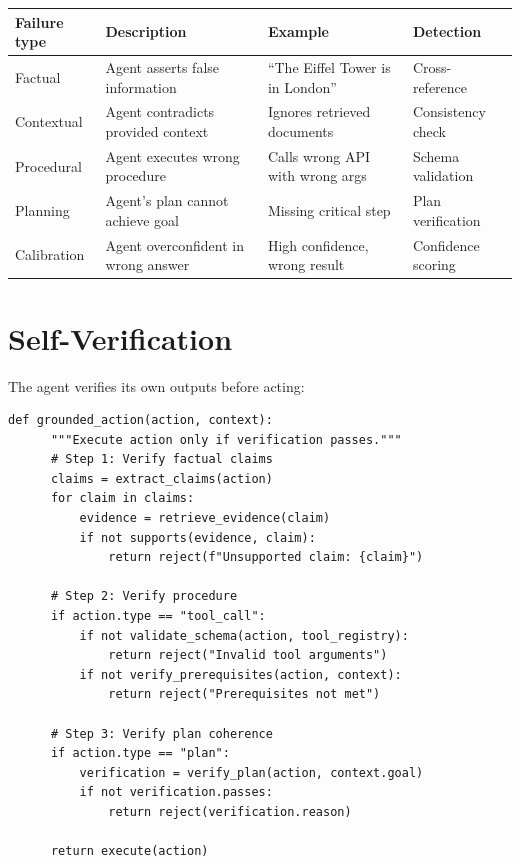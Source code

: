 \begin{longtable}{p{3.5cm}p{4.5cm}p{4.5cm}p{2.5cm}}
	\toprule
	\textbf{Failure type} & \textbf{Description}                & \textbf{Example}                  & \textbf{Detection} \\
	\midrule
	Factual               & Agent asserts false information     & ``The Eiffel Tower is in London'' & Cross-reference    \\
	Contextual            & Agent contradicts provided context  & Ignores retrieved documents       & Consistency check  \\
	Procedural            & Agent executes wrong procedure      & Calls wrong API with wrong args   & Schema validation  \\
	Planning              & Agent's plan cannot achieve goal    & Missing critical step             & Plan verification  \\
	Calibration           & Agent overconfident in wrong answer & High confidence, wrong result     & Confidence scoring \\
	\bottomrule
\end{longtable}

\section{Self-Verification}

The agent verifies its own outputs before acting:

\begin{lstlisting}[caption=Self-verification loop]
  def grounded_action(action, context):
      """Execute action only if verification passes."""
      # Step 1: Verify factual claims
      claims = extract_claims(action)
      for claim in claims:
          evidence = retrieve_evidence(claim)
          if not supports(evidence, claim):
              return reject(f"Unsupported claim: {claim}")

      # Step 2: Verify procedure
      if action.type == "tool_call":
          if not validate_schema(action, tool_registry):
              return reject("Invalid tool arguments")
          if not verify_prerequisites(action, context):
              return reject("Prerequisites not met")

      # Step 3: Verify plan coherence
      if action.type == "plan":
          verification = verify_plan(action, context.goal)
          if not verification.passes:
              return reject(verification.reason)

      return execute(action)
\end{lstlisting}

